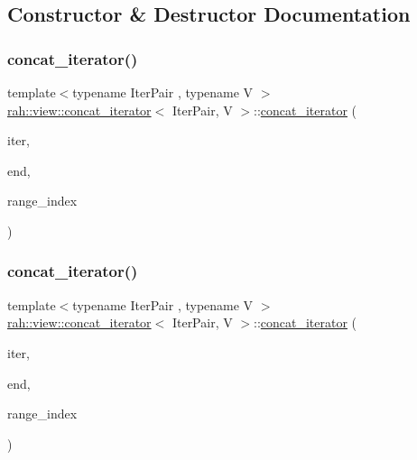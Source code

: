 \subsection{Constructor \& Destructor Documentation}
\mbox{\label{structrah_1_1view_1_1concat__iterator_a45e7ea9b72e7df5390a2ae09a6923d11}} 
\subsubsection{\texorpdfstring{concat\_iterator()}{concat\_iterator()}\hspace{0.1cm}{\footnotesize\ttfamily [1/2]}}
{\footnotesize\ttfamily template$<$typename Iter\+Pair , typename V $>$ \\
\mbox{\hyperlink{structrah_1_1view_1_1concat__iterator}{rah\+::view\+::concat\+\_\+iterator}}$<$ Iter\+Pair, V $>$\+::\mbox{\hyperlink{structrah_1_1view_1_1concat__iterator}{concat\+\_\+iterator}} (\begin{DoxyParamCaption}\item[{Iter\+Pair const \&}]{iter,  }\item[{Iter\+Pair const \&}]{end,  }\item[{size\+\_\+t}]{range\+\_\+index }\end{DoxyParamCaption})\hspace{0.3cm}{\ttfamily [inline]}}

\mbox{\label{structrah_1_1view_1_1concat__iterator_a45e7ea9b72e7df5390a2ae09a6923d11}} 
\subsubsection{\texorpdfstring{concat\_iterator()}{concat\_iterator()}\hspace{0.1cm}{\footnotesize\ttfamily [2/2]}}
{\footnotesize\ttfamily template$<$typename Iter\+Pair , typename V $>$ \\
\mbox{\hyperlink{structrah_1_1view_1_1concat__iterator}{rah\+::view\+::concat\+\_\+iterator}}$<$ Iter\+Pair, V $>$\+::\mbox{\hyperlink{structrah_1_1view_1_1concat__iterator}{concat\+\_\+iterator}} (\begin{DoxyParamCaption}\item[{Iter\+Pair const \&}]{iter,  }\item[{Iter\+Pair const \&}]{end,  }\item[{size\+\_\+t}]{range\+\_\+index }\end{DoxyParamCaption})\hspace{0.3cm}{\ttfamily [inline]}}



